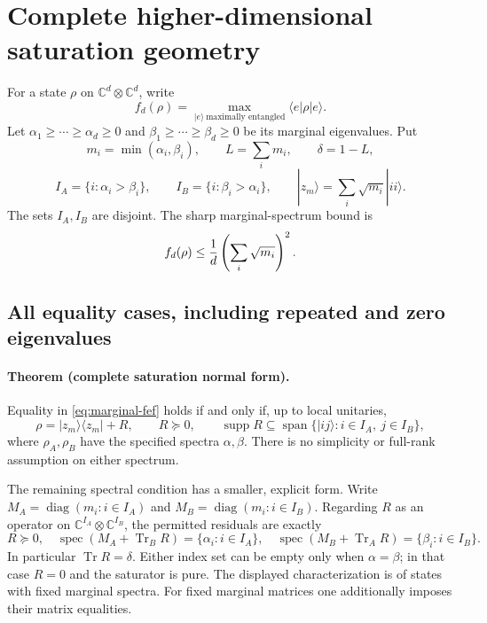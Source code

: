 \section{Complete higher-dimensional saturation geometry}\label{sec:spectral-saturation}

For a state $\rho$ on $\mathbb C^d\otimes\mathbb C^d$, write
\[
 f_d(\rho)=\max_{|e\rangle\ \text{maximally entangled}}
                  \langle e|\rho|e\rangle.
\]
Let $\alpha_1\ge\cdots\ge\alpha_d\ge0$ and
$\beta_1\ge\cdots\ge\beta_d\ge0$ be its marginal eigenvalues. Put
\[
 m_i=\min(\alpha_i,\beta_i),\qquad
 L=\sum_i m_i,\qquad \delta=1-L,
\]
\[
 I_A=\{i:\alpha_i>\beta_i\},\qquad
 I_B=\{i:\beta_i>\alpha_i\},\qquad
 |z_m\rangle=\sum_i\sqrt{m_i}|ii\rangle.
\]
The sets $I_A,I_B$ are disjoint. The sharp marginal-spectrum bound is
\begin{equation}\label{eq:marginal-fef}
 f_d(\rho)\le {1\over d}\left(\sum_i\sqrt{m_i}\right)^2.
\end{equation}

\subsection{All equality cases, including repeated and zero eigenvalues}

\paragraph{Theorem (complete saturation normal form).}
Equality in \eqref{eq:marginal-fef} holds if and only if, up to local unitaries,
\begin{equation}\label{eq:all-saturators}
 \rho=|z_m\rangle\langle z_m|+R,\qquad
 R\succeq0,\qquad
 \operatorname{supp}R\subseteq
       \operatorname{span}\{|ij\rangle:i\in I_A,\ j\in I_B\},
\end{equation}
where $\rho_A,\rho_B$ have the specified spectra $\alpha,\beta$.
There is no simplicity or full-rank assumption on either spectrum.

The remaining spectral condition has a smaller, explicit form. Write
$M_A=\operatorname{diag}(m_i:i\in I_A)$ and
$M_B=\operatorname{diag}(m_i:i\in I_B)$. Regarding $R$ as an operator on
$\mathbb C^{I_A}\otimes\mathbb C^{I_B}$, the permitted residuals are exactly
\[
 R\succeq0,\quad
 \operatorname{spec}(M_A+\operatorname{Tr}_B R)
                  =\{\alpha_i:i\in I_A\},\quad
 \operatorname{spec}(M_B+\operatorname{Tr}_A R)
                  =\{\beta_i:i\in I_B\}.
\]
In particular $\operatorname{Tr}R=\delta$. Either index set can be empty
only when $\alpha=\beta$; in that case $R=0$ and the saturator is pure.
The displayed characterization is of states with fixed marginal spectra.
For fixed marginal matrices one additionally imposes their matrix equalities.


